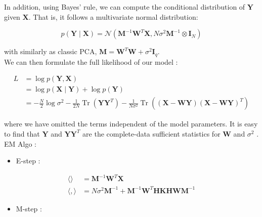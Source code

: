 \documentclass{article}
\begin{document}
In addition, using Bayes’ rule, we can compute the conditional distribution of $\mathbf{Y}$ given $\mathbf{X}$. That is, it follows a multivariate normal distribution:

\begin{equation}
    p(\mathbf{Y} \mid \mathbf{X}) =  \mathcal{N}(\mathbf{M}^{-1} \mathbf{W}^T \mathbf{X}, N \sigma^2 \mathbf{M}^{-1} \otimes \mathbf{I}_N)
\end{equation}

with similarly as classic PCA, $\mathbf{M} = \mathbf{W}^T \mathbf{W} + \sigma^2 \mathbf{I}_q $.\\

We can then formulate the full likelihood of our model :

\begin{equation}
    \begin{aligned}
        L &=  \log p(\mathbf{Y},\mathbf{X})\\
        &=  \log p(\mathbf{X} \mid \mathbf{Y}) + \log p(\mathbf{Y}) \\
        &= - \frac{N}{2}  \log \sigma^2  - \frac{1}{2N} \operatorname{Tr}(\mathbf{Y} \mathbf{Y}^T) -  \frac{1}{N \sigma^2} \operatorname{Tr}((\mathbf{X} - \mathbf{W} \mathbf{Y})(\mathbf{X} - \mathbf{W} \mathbf{Y})^T)
    \end{aligned}
    \label{log_pkpca}
\end{equation}

where we have omitted the terms independent of the model parameters. It is easy to find that $\mathbf{Y}$ and $\mathbf{Y} \mathbf{Y}^T$ are the complete-data sufficient statistics for $\mathbf{W}$ and $\sigma^2$ . \\


EM Algo :
\begin{itemize}
    \item E-step :
\end{itemize}

\begin{equation}
    \begin{aligned}
        \langle \rangle &= \mathbf{M}^{-1} \mathbf{W}^T \mathbf{X} \\
        \langle , \rangle &= N \sigma^2 \mathbf{M}^{-1} + \mathbf{M}^{-1} \mathbf{W}^T \mathbf{H} \mathbf{K} \mathbf{H} \mathbf{W} \mathbf{M}^{-1} 
    \end{aligned}
    \label{e_step_pkpca}
\end{equation}

\begin{itemize}
    \item M-step : 
\end{itemize}
\end{document}
